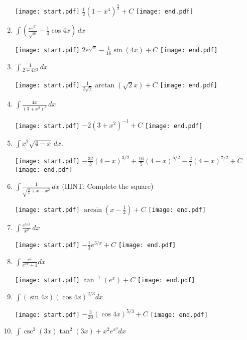\documentclass[12pt]{article}
\begin{document}
\begin{enumerate}
\texttt{[image: start.pdf]}
{{$\frac{1}{2}(1-x^{4})^{\frac{3}{2}}+C$}}
\texttt{[image: end.pdf]}


\item $\int \left(\frac{e^{\sqrt{x}}}{\sqrt{x}}-\frac{1}{4}\cos{4x}\right) \,dx$ 

\texttt{[image: start.pdf]}
{{$2e^{\sqrt{x}}-\frac{1}{16}\sin{(4x)}+C$}}
\texttt{[image: end.pdf]}


\item $\int \frac{1}{2+4x^2} \,dx$ 

\texttt{[image: start.pdf]}
{{$\frac{1}{2\sqrt{2}}\arctan{(\sqrt{2}x)}+C$}}
\texttt{[image: end.pdf]}


\item $\int \frac{4x}{(3+x^2)^2} \,dx$ 

\texttt{[image: start.pdf]}
{{$-2(3+x^2)^{-1}+C$}}
\texttt{[image: end.pdf]}


\item $\int x^2\sqrt{4-x} \,dx$. 

\texttt{[image: start.pdf]}
{{$-\frac{32}{3}(4-x)^{3/2}+\frac{16}{5}(4-x)^{5/2}-\frac{2}{7}(4-x)^{7/2}+C$}}
\texttt{[image: end.pdf]}


\item $\int \frac{1}{\sqrt{\frac{3}{4}+x-x^2}} \,dx$ (HINT: Complete the square)

\texttt{[image: start.pdf]}
{{$\arcsin{\left(x-\frac{1}{2}\right)}+C$}}
\texttt{[image: end.pdf]}


\item $\int{\frac{e^{3/x}}{x^2}} \,dx$

\texttt{[image: start.pdf]}
{{$-\frac{1}{3}e^{3/x}+C$}}
\texttt{[image: end.pdf]}


\item $\int \frac{e^x}{e^{2x}+1}dx$ 

\texttt{[image: start.pdf]}
{{$\tan^{-1}{(e^x)}+C$}}
\texttt{[image: end.pdf]}


\item $\int (\sin{4x})(\cos{4x})^{2/3}dx$ 

\texttt{[image: start.pdf]}
{{$-\frac{3}{20}(\cos{4x})^{5/3}+C$}}
\texttt{[image: end.pdf]}


\item $\int \csc^{2}{(3x)}\tan^{2}{(3x)}+x^2e^{x^3}dx$ 


\end{enumerate}
\end{document}
